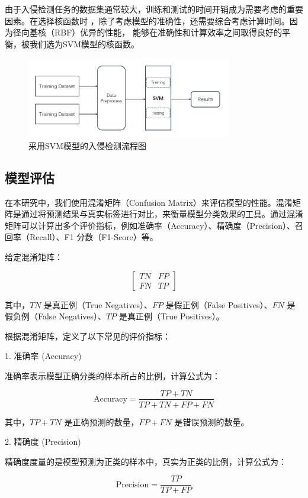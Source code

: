 \documentclass{article}
\begin{document}
由于入侵检测任务的数据集通常较大，训练和测试的时间开销成为需要考虑的重要因素。在选择核函数时
，除了考虑模型的准确性，还需要综合考虑计算时间。因为径向基核（RBF）优异的性能，
能够在准确性和计算效率之间取得良好的平衡，被我们选为SVM模型的核函数。
\begin{figure}[H]
  \centering
  \includegraphics[width=0.8\textwidth]{./png/model.png}
  \caption{采用SVM模型的入侵检测流程图}
  \label{fig:svm}
\end{figure}
\subsection{模型评估}

在本研究中，我们使用混淆矩阵（Confusion Matrix）来评估模型的性能。混淆矩阵是通过将预测结果与真实标签进行对比，来衡量模型分类效果的工具。通过混淆矩阵可以计算出多个评价指标，例如准确率（Accuracy）、精确度（Precision）、召回率（Recall）、F1 分数（F1-Score）等。

给定混淆矩阵：

\[
\begin{bmatrix}
    TN & FP \\
    FN & TP
\end{bmatrix}
\]

其中，$TN$ 是真正例（True Negatives）、$FP$ 是假正例（False Positives）、$FN$ 是假负例（False Negatives）、$TP$ 是真正例（True Positives）。

根据混淆矩阵，定义了以下常见的评价指标：

1. 准确率 (Accuracy)

   准确率表示模型正确分类的样本所占的比例，计算公式为：

   \[
   \text{Accuracy} = \frac{TP + TN}{TP + TN + FP + FN}
   \]

   其中，$TP + TN$ 是正确预测的数量，$FP + FN$ 是错误预测的数量。

2. 精确度 (Precision)

   精确度度量的是模型预测为正类的样本中，真实为正类的比例，计算公式为：

   \[
   \text{Precision} = \frac{TP}{TP + FP}
   \]
\end{document}
